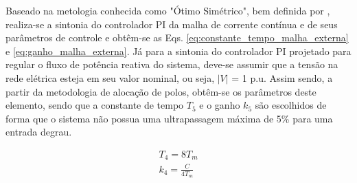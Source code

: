 Baseado na metologia conhecida como "Ótimo Simétrico", bem definida por \cite{ArticleRezek}, realiza-se a sintonia do controlador PI da malha de corrente contínua e de seus parâmetros de controle e obtêm-se as Eqs. \ref{eq:constante_tempo_malha_externa} e \ref{eq:ganho_malha_externa}. Já para a sintonia do controlador PI projetado para regular o fluxo de potência reativa do sistema, deve-se assumir que a tensão na rede elétrica esteja em seu valor nominal, ou seja, $|V|$ = 1 p.u. Assim sendo, a partir da metodologia de alocação de polos, obtêm-se os parâmetros deste elemento, sendo que a constante de tempo $T_5$ e o ganho $k_5$ são escolhidos de forma que o sistema não possua uma ultrapassagem máxima de 5\% para uma entrada degrau.

\begin{align}
	T_4 = 8T_m\label{eq:constante_tempo_malha_externa}\\
	k_4 = \frac{C}{4T_m}\label{eq:ganho_malha_externa}
\end{align}